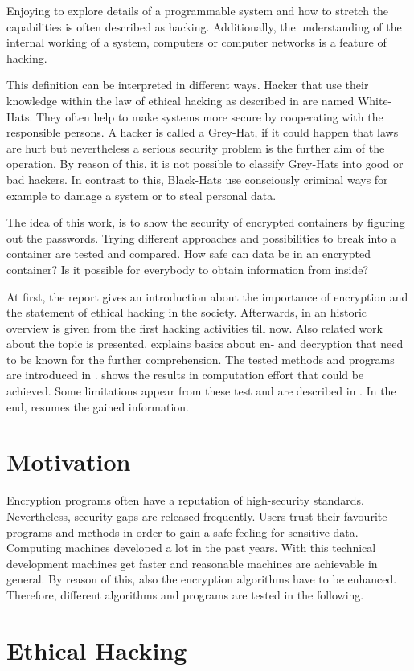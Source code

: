 
Enjoying to explore details of a programmable system and how to stretch the capabilities is often described as hacking. Additionally, the understanding of the internal working of a system, computers or computer networks is a feature of hacking. \cite{jargon}

This definition can be interpreted in different ways. Hacker that use their knowledge within the law of ethical hacking as described in  are named White-Hats. They often help to make systems more secure by cooperating with the responsible persons. A hacker is called a Grey-Hat, if it could happen that laws are hurt but nevertheless a serious security problem is the further aim of the operation. By reason of this, it is not possible to classify Grey-Hats into good or bad hackers. In contrast to this, Black-Hats use consciously criminal ways for example to damage a system or to steal personal data.

The idea of this work, is to show the security of encrypted containers by figuring out the passwords. Trying different approaches and possibilities to break into a container are tested and compared. How safe can data be in an encrypted container? Is it possible for everybody to obtain information from inside?

At first, the report gives an introduction about the importance of encryption and the statement of ethical hacking in the society. Afterwards, in  an historic overview is given from the first hacking activities till now. Also related work about the topic is presented.  explains basics about en- and decryption that need to be known for the further comprehension. The tested methods and programs are introduced in .  shows the results in computation effort that could be achieved. Some limitations appear from these test and are described in . In the end,  resumes the gained information.

\section{Motivation}
\label{sec:motivation}

Encryption programs often have a reputation of high-security standards. Nevertheless, security gaps are released frequently. Users trust their favourite programs and methods in order to gain a safe feeling for sensitive data. Computing machines developed a lot in the past years. With this technical development machines get faster and reasonable machines are achievable in general. By reason of this, also the encryption algorithms have to be enhanced. Therefore, different algorithms and programs are tested in the following. 


\section{Ethical Hacking}
\label{sec:ethical}
